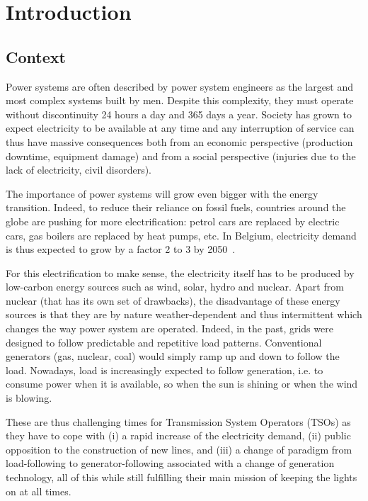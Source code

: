\chapter{Introduction}

\section{Context}

Power systems are often described by power system engineers as the largest and most complex systems built by men. Despite this complexity, they must operate without discontinuity 24 hours a day and 365 days a year. Society has grown to expect electricity to be available at any time and any interruption of service can thus have massive consequences both from an economic perspective (production downtime, equipment damage) and from a social perspective (injuries due to the lack of electricity, civil disorders).

The importance of power systems will grow even bigger with the energy transition. Indeed, to reduce their reliance on fossil fuels, countries around the globe are pushing for more electrification: petrol cars are replaced by electric cars, gas boilers are replaced by heat pumps, etc. In Belgium, electricity demand is thus expected to grow by a factor 2 to 3 by 2050~\cite{FES_in_5}.

For this electrification to make sense, the electricity itself has to be produced by low-carbon energy sources such as wind, solar, hydro and nuclear. Apart from nuclear (that has its own set of drawbacks), the disadvantage of these energy sources is that they are by nature weather-dependent and thus intermittent which changes the way power system are operated. Indeed, in the past, grids were designed to follow predictable and repetitive load patterns. Conventional generators (gas, nuclear, coal) would simply ramp up and down to follow the load. Nowadays, load is increasingly expected to follow generation, i.e. to consume power when it is available, so when the sun is shining or when the wind is blowing.

These are thus challenging times for Transmission System Operators (TSOs) as they have to cope with (i) a rapid increase of the electricity demand, (ii) public opposition to the construction of new lines, and (iii) a change of paradigm from load-following to generator-following associated with a change of generation technology, all of this while still fulfilling their main mission of keeping the lights on at all times.



